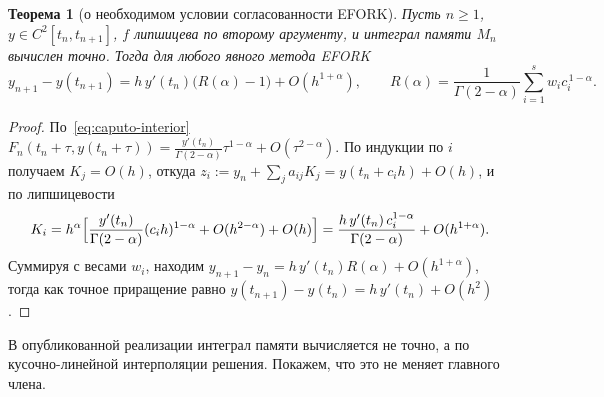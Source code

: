 \documentclass[11pt,a4paper]{article}
\theoremstyle{plain}
\newtheorem{theorem}{Теорема}
\theoremstyle{definition}
\newcommand{\G}{\Gamma}
\begin{document}
\begin{theorem}[о необходимом условии согласованности EFORK]\label{thm:efork}
Пусть $n\ge1$, $y\in C^2[t_n,t_{n+1}]$, $f$ липшицева по второму аргументу, и интеграл памяти $M_n$ вычислен точно. Тогда для любого явного метода EFORK
\[
y_{n+1}-y(t_{n+1})=h\,y'(t_n)\bigl(R(\alpha)-1\bigr)+O(h^{1+\alpha}),\qquad
R(\alpha)=\frac{1}{\G(2-\alpha)}\sum_{i=1}^{s}w_ic_i^{\,1-\alpha}.
\]
\end{theorem}
\begin{proof}
По~\eqref{eq:caputo-interior} $F_n(t_n+\tau,y(t_n+\tau))=\frac{y'(t_n)}{\G(2-\alpha)}\tau^{1-\alpha}+O(\tau^{2-\alpha})$. По индукции по $i$ получаем $K_j=O(h)$, откуда $z_i:=y_n+\sum_j a_{ij}K_j=y(t_n+c_ih)+O(h)$, и по липшицевости
\[
K_i=h^{\alpha}\Bigl[\frac{y'(t_n)}{\G(2-\alpha)}(c_ih)^{1-\alpha}+O(h^{2-\alpha})+O(h)\Bigr]
=\frac{h\,y'(t_n)\,c_i^{1-\alpha}}{\G(2-\alpha)}+O(h^{1+\alpha}).
\]
Суммируя с весами $w_i$, находим $y_{n+1}-y_n=h\,y'(t_n)R(\alpha)+O(h^{1+\alpha})$, тогда как точное приращение равно $y(t_{n+1})-y(t_n)=h\,y'(t_n)+O(h^2)$.
\end{proof}

В опубликованной реализации интеграл памяти вычисляется не точно, а по кусочно-линейной интерполяции решения. Покажем, что это не меняет главного члена.
\end{document}
